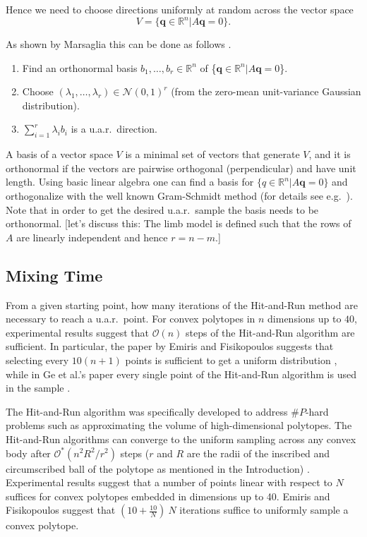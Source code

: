 Hence we need to choose directions uniformly at random across the vector space 
\[V = \{\textbf{q} \in \mathbb{R}^n | A\textbf{q} = 0\}.\]

As shown by Marsaglia this can be done as follows \cite{Marsaglia}.
\begin{enumerate}
\item
Find an orthonormal basis $b_1, \dots, b_r \in \mathbb{R}^{n}$ of \{$\textbf{q} \in \mathbb{R}^n | A\textbf{q} = 0$\}.
\item
Choose $(\lambda_1, \dots, \lambda_r) \in \mathcal{N}(0,1)^r$ (from the zero-mean unit-variance Gaussian distribution).
\item
$\sum_{i=1}^r \lambda_i b_i$ is a u.a.r.\ direction.
\end{enumerate}

A basis of a vector space $V$ is a minimal set of vectors that generate $V$, and it is orthonormal if the vectors are pairwise orthogonal (perpendicular) and have unit length. Using basic linear algebra one can find a basis for $\{q \in \mathbb{R}^n | A\textbf{q} = 0\}$ and orthogonalize with the well known Gram-Schmidt method (for details see e.g.\ \cite{Robertson}). Note that in order to get the desired u.a.r.\ sample the basis needs to be orthonormal. [let's discuss this: The limb model is defined such that the rows of $A$ are linearly independent and hence $r=n-m$.]

\subsection*{Mixing Time}
\label{sec_lengthrun}
From a given starting point, how many iterations of the Hit-and-Run method are necessary to reach a u.a.r.\ point.
For convex polytopes in $n$ dimensions up to $40$, experimental results suggest that $\mathcal{O}(n)$ steps of the Hit-and-Run algorithm are sufficient.
In particular, the paper \cite{emiris2013efficient} by Emiris and Fisikopoulos suggests that selecting every $10(n + 1)$ points is sufficient to get a uniform distribution \cite{emiris2013efficient}, while in Ge et al.'s paper every single point of the Hit-and-Run algorithm is used in the sample \cite{Ge}.


The Hit-and-Run algorithm was specifically developed to address $\#P$-hard problems such as approximating the volume of high-dimensional polytopes\cite{Dyer}. The Hit-and-Run algorithms can converge to the uniform sampling across any convex body \cite{smith1984efficient} after $\mathcal{O}^*(n^2R^2/r^2)$ steps ($r$ and $R$ are the radii of the inscribed and circumscribed ball of the polytope as mentioned in the Introduction) \cite{Dyer, Lovasz}.  Experimental results  suggest that a number of points linear with respect to $N$  suffices for convex polytopes embedded in dimensions up to 40.  Emiris and Fisikopoulos \cite{emiris2013efficient} suggest that  $(10 + \frac{10}{N})~N$ iterations suffice to uniformly sample a convex polytope.





